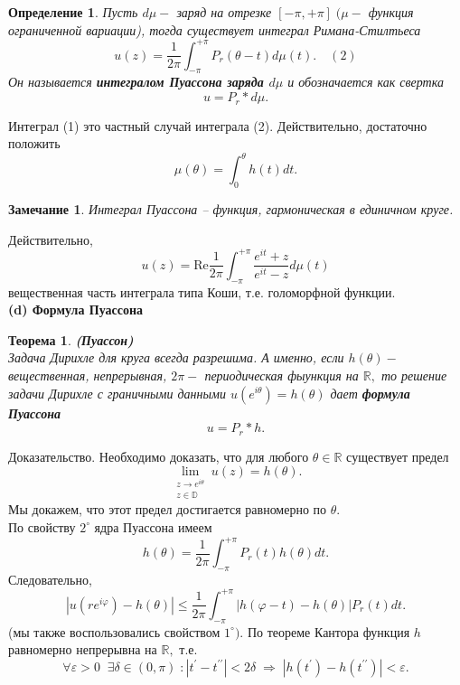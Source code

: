 \documentclass[12pt,a4paper]{article}
\theoremstyle{plain}   \newtheorem{Pro}{Задача}
\newtheorem{Def}{Определение}
\newtheorem{Rem}{Замечание}
\newtheorem{The}{Теорема}
\begin{document}
\begin{Def}
Пусть
$ d\mu - $
заряд на отрезке
$ [-\pi , +\pi ] \; ( \mu -  $
функция ограниченной вариации), тогда существует интеграл
Римана-Стилтьеса
$$
  u(z)=\frac{1}{2\pi}\int _{-\pi}^{+\pi}
  P_r (\theta -t )d\mu (t) . \quad (2)
$$
Он называется
{\bfseries интегралом Пуассона заряда
$ d\mu $ }
и обозначается как свертка
$$
  u=P_r \ast d\mu .
$$
\end{Def}
Интеграл (1) это частный случай интеграла (2).
Действительно, достаточно положить
$$
  \mu (\theta )=\int _0 ^{\theta} h(t)dt.
$$
\begin{Rem}
Интеграл Пуассона -- функция, гармоническая в единичном круге.
\end{Rem}
Действительно,
$$
  u(z)= \mathrm{Re} \frac{1}{2\pi}\int _{-\pi}^{+\pi}
  \frac{e^{it}+z}{e^{it}-z}d\mu (t)
$$
вещественная часть интеграла типа Коши, т.е. голоморфной функции.
\\
{\bfseries (d) Формула Пуассона}
\begin{The}
{\bfseries (Пуассон)}
\\
Задача Дирихле для круга всегда разрешима. А именно, если
$ h(\theta ) - $
вещественная, непрерывная,
$ 2\pi - $
периодическая фыункция на
$ \mathbb{R} , $
то решение задачи Дирихле с граничными данными
$ u(e^{i\theta})=h(\theta ) $
дает
{\bfseries формула Пуассона}
$$
  u=P_r \ast h.
$$
\end{The}
{\Large Доказательство.}
Необходимо доказать, что для любого
$ \theta \in \mathbb{R} $
существует предел
$$
  \lim _{\substack{z \rightarrow e^{i\theta}\\ z \in \mathbb{D}}}
   u(z)=h(\theta ).
$$
Мы докажем, что этот предел достигается равномерно по
$ \theta . $
\\
По свойству
$ 2^{\circ} $
ядра Пуассона имеем
$$
  h(\theta )=\frac{1}{2\pi}\int _{-\pi}^{+\pi}
  P_r (t)h(\theta )dt.
$$
Следовательно,
$$
  | u(re^{i \varphi})-h(\theta )| \leq \frac{1}{2\pi}
  \int _{-\pi}^{+\pi} |h(\varphi -t)-h(\theta )|P_r (t)dt.
$$
(мы также воспользовались свойством
$ 1^{\circ} ) . $
По теореме Кантора функция
$ h $
равномерно непрерывна на
$ \mathbb{R} , $
т.е.
$$
  \forall \varepsilon >0 \; \; \exists \delta \in (0,\pi ) \; :
  |t^{\prime}-t^{\prime \prime }|<2 \delta \; \Rightarrow \;
  |h(t^{\prime})-h(t^{\prime \prime})|< \varepsilon .
$$
\end{document}
